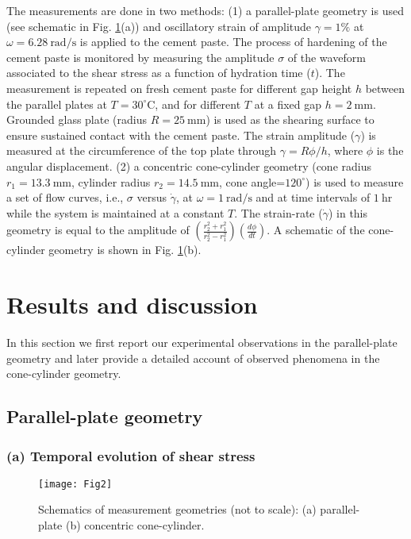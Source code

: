 \documentclass[final,5p,twocolumn]{elsarticle}
\begin{document}
{The measurements are done in two methods: (1)  a parallel-plate geometry is used (see schematic in Fig. \ref{fig1_schematic}(a)) and oscillatory strain of amplitude $\gamma=1\%$  at  $\omega=6.28~\mbox{rad/s}$  is applied to the cement paste. The process of hardening of the cement paste is monitored by measuring the amplitude $\sigma$ of the waveform associated to the shear stress as a function of hydration time ($t$).  The measurement is repeated on fresh cement paste for different gap height $h$ between the parallel plates  at $T=30^\circ\mbox{C}$, and for different $T$ at a fixed gap $h=2~\mbox{mm}$. Grounded glass plate (radius $R=25~\mbox{mm}$) is used as the shearing surface to ensure sustained contact with the cement paste. The strain amplitude ($\gamma$) is measured at the circumference of the top plate through $\gamma=R\phi/h$, where $\phi$ is the angular displacement. (2) a concentric cone-cylinder geometry (cone radius $r_1=13.3~\mbox{mm}$, cylinder radius $r_2=14.5~\mbox{mm}$, cone angle=$120^{\circ}$) is used to measure a set of flow curves, i.e., $\sigma$ versus $\dot\gamma$, at $\omega=1~\mbox{rad/s}$ and at time intervals of $1~\mbox{hr}$ while the system is maintained at a constant $T$. The  strain-rate ($\dot{\gamma}$) in this geometry is equal to the amplitude of $(\frac{r_2^2+r_1^2}{r_2^2-r_1^2})(\frac{d\phi}{dt})$. A schematic of the cone-cylinder geometry is shown in Fig. \ref{fig1_schematic}(b).
	 

	
\section{Results and discussion} 


In this section we first report our experimental observations in the  parallel-plate geometry and  later provide a detailed account of observed phenomena  in the cone-cylinder geometry.  
\subsection{Parallel-plate geometry} 
\subsubsection*{(a) Temporal evolution of shear stress} 

	 	\begin{figure}[t!]
		\centering
		\texttt{[image: Fig2]}
		\caption{Schematics of measurement geometries (not to scale): (a) parallel-plate (b) concentric cone-cylinder. }
		\label{fig1_schematic}
	\end{figure}
	
}
\end{document}
